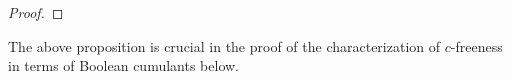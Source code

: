\documentclass[12pt]{amsart}
\DeclareMathOperator{\IntPart}{\mathit{Int}}
\DeclareMathOperator{\NC}{\mathit{NC}} %
\DeclareMathOperator{\IB}{\mathrm{inn}} %
\DeclareMathOperator{\OB}{\mathrm{out}} %
\theoremstyle{definition}
\numberwithin{equation}{section}
\begin{document}
\begin{proof}
\end{proof}

The above proposition is crucial in the proof of the characterization of $c$-freeness in terms of Boolean cumulants below.
\end{document}
